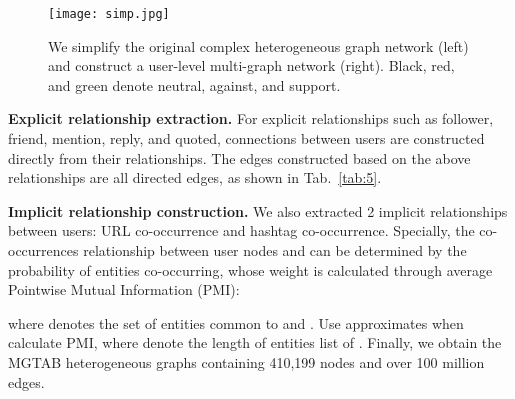 \documentclass[10pt,twocolumn,letterpaper]{article}
\begin{document}
\begin{figure*}[ht]
  \centering
   \texttt{[image: simp.jpg]}
     \vspace{-0.2cm}
   \caption{We simplify the original complex heterogeneous graph network (left) and construct a user-level multi-graph network (right). Black, red, and green denote neutral, against, and support.}
     \vspace{-0.2cm}
   \label{fig:7}
\end{figure*}

\noindent
\textbf{Explicit relationship extraction.}
For explicit relationships such as follower, friend, mention, reply, and quoted, connections between users are constructed directly from their relationships. The edges constructed based on the above relationships are all directed edges, as shown in Tab.~\ref{tab:5}.

\noindent
\textbf{Implicit relationship construction.}
We also extracted 2 implicit relationships between users: URL co-occurrence and hashtag co-occurrence. Specially, the co-occurrences relationship between user nodes  and  can be determined by the probability of entities co-occurring, whose weight is calculated through average Pointwise Mutual Information (PMI):

\vspace{-0.2cm}


where  denotes the set of entities common to  and . Use  approximates  when calculate PMI, where  denote the length of entities list of . Finally, we obtain the MGTAB heterogeneous graphs containing 410,199 nodes and over 100 million edges.
\end{document}
